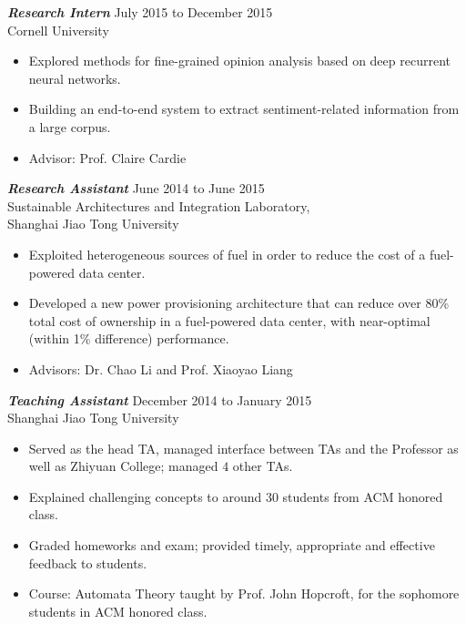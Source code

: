 \documentclass[margin, 10pt]{res} %
\begin{document}
\begin{resume}
{\sl \textbf{Research Intern}} \hfill July 2015 to December 2015\\
Cornell University
\begin{itemize}
\item Explored methods for fine-grained opinion analysis based on deep recurrent
  neural networks.
\item Building an end-to-end system to extract sentiment-related information
  from a large corpus.
\item Advisor: Prof. Claire Cardie
\end{itemize}

{\sl \textbf{Research Assistant}} \hfill June 2014 to June 2015\\
Sustainable Architectures and Integration Laboratory, \\
Shanghai Jiao Tong University
\begin{itemize}
\item Exploited heterogeneous sources of fuel in order to reduce the cost of a
  fuel-powered data center.
\item Developed a new power provisioning architecture that can reduce over 80\%
  total cost of ownership in a fuel-powered data center, with near-optimal
  (within 1\% difference) performance.
\item Advisors: Dr. Chao Li and Prof. Xiaoyao Liang
\end{itemize}

{\sl \textbf{Teaching Assistant}} \hfill December 2014 to January 2015\\
Shanghai Jiao Tong University
\begin{itemize}
\item Served as the head TA, managed interface between TAs and the Professor
  as well as Zhiyuan College; managed $4$ other TAs.
\item Explained challenging concepts to around $30$ students from ACM honored class.
\item Graded homeworks and exam; provided timely, appropriate and effective feedback to students.
\item Course: Automata Theory taught by Prof. John Hopcroft, for the sophomore students in ACM honored class.
\end{itemize} 



\end{resume}
\end{document}
